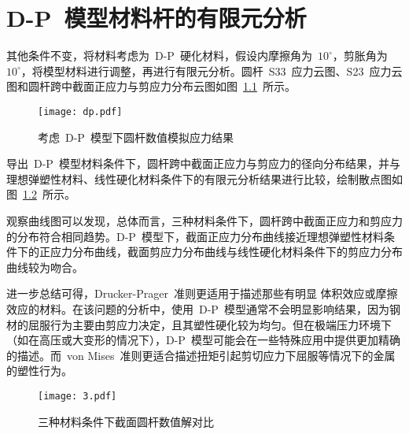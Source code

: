 \chapter{D-P~模型材料杆的有限元分析}
\label{cha:DP}
其他条件不变，将材料考虑为~D-P~硬化材料，假设内摩擦角为~{$10^\circ$}，剪胀角为~{$10^\circ$}，将模型材料进行调整，再进行有限元分析。圆杆~S33~应力云图、S23~应力云图和圆杆跨中截面正应力与剪应力分布云图如图~\ref{fig:dp}~所示。
\begin{figure}[htbp]
    \centering
	\texttt{[image: dp.pdf]}
    \caption{考虑~D-P~模型下圆杆数值模拟应力结果}
    \label{fig:dp}
\end{figure}

导出~D-P~模型材料条件下，圆杆跨中截面正应力与剪应力的径向分布结果，并与理想弹塑性材料、线性硬化材料条件下的有限元分析结果进行比较，绘制散点图如图~\ref{fig:dps3323}~所示。

观察曲线图可以发现，总体而言，三种材料条件下，圆杆跨中截面正应力和剪应力的分布符合相同趋势。D-P~模型下，截面正应力分布曲线接近理想弹塑性材料条件下的正应力分布曲线，截面剪应力分布曲线与线性硬化材料条件下的剪应力分布曲线较为吻合。

进一步总结可得，Drucker-Prager~准则更适用于描述那些有明显 体积效应或摩擦效应的材料。在该问题的分析中，使用~D-P~模型通常不会明显影响结果，因为钢材的屈服行为主要由剪应力决定，且其塑性硬化较为均匀。但在极端压力环境下（如在高压或大变形的情况下），D-P~模型可能会在一些特殊应用中提供更加精确的描述\cite{Drucker1952}。而~von Mises~准则更适合描述扭矩引起剪切应力下屈服等情况下的金属的塑性行为。
\begin{figure}[htbp]
    \centering
	\texttt{[image: 3.pdf]}
    \caption{三种材料条件下截面圆杆数值解对比}
    \label{fig:dps3323}
\end{figure}